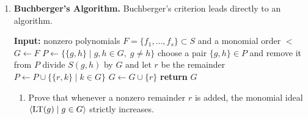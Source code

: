 \documentclass[12pt,reqno]{amsart}
\begin{document}
\begin{enumerate}[leftmargin=*, resume=problems]
\begin{enumerate}[label=(\alph*),ref=\theenumi\alph*]
    \item For the converse, let $f\in I$ and write $f=q_1g_1+\cdots+q_tg_t$. For such a representation, define
    \[
    \delta(q_1,\ldots,q_t)=\max_i\LM(q_ig_i).
    \]
    Choose a representation of $f$ for which $\delta$ is as small as possible. Explain why this makes sense.
    
    \item Show that if the terms of monomial $\delta$ in the sum $\sum q_ig_i$ do not cancel, then $\LT(f)$ is divisible by some $\LT(g_i)$.
    
    \item Suppose instead that the terms of monomial $\delta$ cancel. Show that the cancellation gives a nontrivial relation among leading terms of some $g_i$'s.
    
    \item Use the assumption that every $S(g_i,g_j)$ reduces to zero to replace this relation by a combination of the $g_i$'s whose terms all have monomial strictly smaller than $\delta$.
    
    \item Explain why part (e) contradicts the minimal choice of the representation unless $\LT(f)$ is divisible by some $\LT(g_i)$.
    
    \item Conclude that $\init_<(I)=\langle \LT(g_1),\ldots,\LT(g_t)\rangle$.
\end{enumerate}

\item \textbf{Buchberger's Algorithm.} Buchberger's criterion leads directly to an algorithm.
\begin{algorithm}[H]
\caption{Buchberger's Algorithm}
\begin{algorithmic}[1]
\State \textbf{Input:} nonzero polynomials $F=\{f_1,\ldots,f_s\}\subset S$ and a monomial order $<$
\State $G\gets F$
\State $P\gets \{\{g,h\}\mid g,h\in G,\; g\neq h\}$
    \State choose a pair $\{g,h\}\in P$ and remove it from $P$
    \State divide $S(g,h)$ by $G$ and let $r$ be the remainder
        \State $P\gets P\cup \{\{r,k\}\mid k\in G\}$
        \State $G\gets G\cup\{r\}$
    \EndIf
\EndWhile
\State \textbf{return} $G$
\end{algorithmic}
\end{algorithm}

\begin{enumerate}[label=(\alph*),ref=\theenumi\alph*]
    \item Prove that whenever a nonzero remainder $r$ is added, the monomial ideal $\langle \operatorname{LT}(g)\mid g\in G\rangle$ strictly increases.
    

\end{enumerate}
\end{enumerate}
\end{document}
